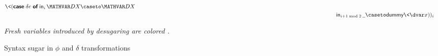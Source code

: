 \begin{figure}
\begin{align*}
    \<(\emcase{\delta e}
    \inj i \mvar\dx \caseto \mvar\dx
    \\
    &\qquad\phantom{(\inj i {\mvar y} \caseto {} (\efn{\dx} \delta f_i) \<(\emcase{\delta e}}
    \inj{i+1 \bmod 2} \pwild \caseto \dummy\<\dvar x
    ))_i
  \end{align*}

  \centering\itshape
  Fresh variables introduced by desugaring are colored {\color{fresh}\freshname}.

  \caption{Syntax sugar in $\phi$ and $\delta$ transformations}
  \label{appendix-seminaive-syntax-sugar}
\end{figure}



\DeltaLattice*
\DeltaLatticeProof*


\nextlemma
\PhiEqualityType*
\PhiEqualityTypeProof*


\nextlemma
\PhiDeltaWellTyped*

